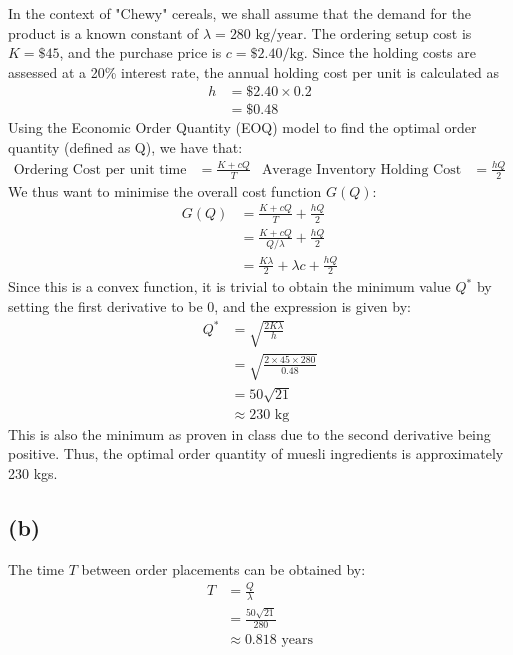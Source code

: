 \documentclass[12pt]{article}
\begin{document}
In the context of "Chewy" cereals, we shall assume that the demand for the product is a known constant of $\lambda = 280 \text{ kg}/\text{year}$. The ordering setup cost is $K = \$ 45$, and the purchase price is $c = \$ 2.40 / \text{kg}$. Since the holding costs are assessed at a 20\% interest rate, the annual holding cost per unit is calculated as \begin{align*}
    h &= \$ 2.40 \times 0.2 \\ 
    &= \$ 0.48
\end{align*} Using the Economic Order Quantity (EOQ) model to find the optimal order quantity (defined as Q), we have that: \begin{align*}
    \text{Ordering Cost per unit time} &= \frac{K + cQ}{T} & \text{Average Inventory Holding Cost} &= \frac{hQ}{2}
\end{align*} We thus want to minimise the overall cost function $G(Q)$: \begin{align*}
    G(Q) &= \frac{K + cQ}{T} + \frac{hQ}{2} \\ 
    &= \frac{K + cQ}{Q / \lambda} + \frac{hQ}{2} \\ 
    &= \frac{K\lambda}{2} + \lambda c + \frac{hQ}{2}
\end{align*} Since this is a convex function, it is trivial to obtain the minimum value $Q^{*}$ by setting the first derivative to be 0, and the expression is given by: \begin{align*}
    Q^{*} &= \sqrt{\frac{2K\lambda}{h}} \\ 
    &= \sqrt{ \frac{2 \times 45 \times 280}{0.48}} \\ 
    &= 50\sqrt{21} \\ 
    &\approx \boxed{230 \text{ kg}}
\end{align*} This is also the minimum as proven in class due to the second derivative being positive. Thus, the optimal order quantity of muesli ingredients is approximately 230 kgs. 

\subsection*{(b)}   

The time $T$ between order placements can be obtained by: \begin{align*}
    T &= \frac{Q}{\lambda} \\ 
    &= \frac{50\sqrt{21}}{280} \\ 
    &\approx \boxed{0.818 \text{ years}}
\end{align*}
\end{document}
